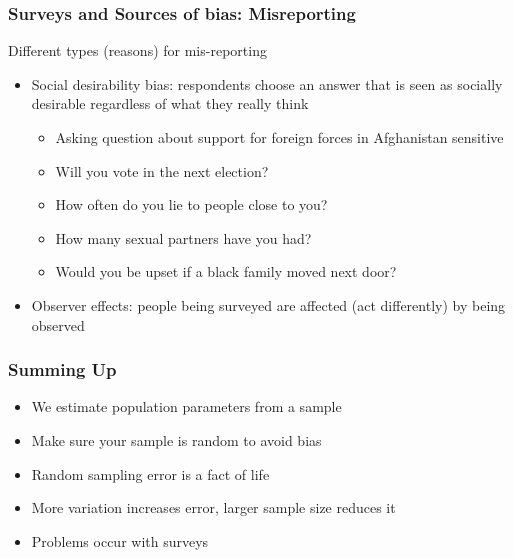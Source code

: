 \documentclass{beamer}
\begin{document}
\begin{frame}
 \frametitle{Surveys and Sources of bias: Misreporting}
 Different types (reasons) for mis-reporting
 \begin{itemize}[<+->]
   \item Social desirability bias: respondents choose an answer that is seen as socially desirable regardless of what they really think
     \begin{itemize}
       \item Asking question about support for foreign forces in Afghanistan sensitive
       \item Will you vote in the next election?
       \item How often do you lie to people close to you?
       \item How many sexual partners have you had?
       \item Would you be upset if a black family moved next door?
     \end{itemize}
   \item Observer effects: people being surveyed are affected (act differently) by being observed
 \end{itemize}
\end{frame}

\begin{frame}
 \frametitle<+->{Summing Up}
 \begin{itemize}[<+->]
  \item We estimate population parameters from a sample
  \item Make sure your sample is random to avoid bias
  \item Random sampling error is a fact of life
  \item 	More variation increases error, larger sample size reduces it
  \item Problems occur with surveys
 \end{itemize}
\end{frame}
\end{document}
